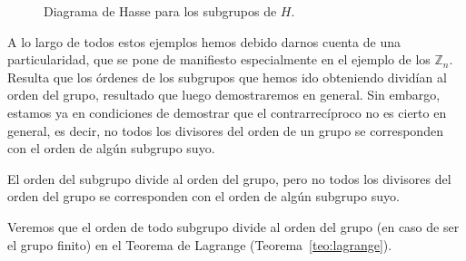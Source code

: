 \begin{ejemplo}
\begin{figure}[H]
    \centering
    \caption{Diagrama de Hasse para los subgrupos de $H$.}
\end{figure}
\end{ejemplo}

A lo largo de todos estos ejemplos hemos debido darnos cuenta de una particularidad, que se pone de manifiesto especialmente en el ejemplo de los $\mathbb{Z}_n$. Resulta que los órdenes de los subgrupos que hemos ido obteniendo dividían al orden del grupo, resultado que luego demostraremos en general. Sin embargo, estamos ya en condiciones de demostrar que el contrarrecíproco no es cierto en general, es decir, no todos los divisores del orden de un grupo se corresponden con el orden de algún subgrupo suyo.

\begin{prop} 
    El orden del subgrupo divide al orden del grupo, pero no todos los divisores del orden del grupo se corresponden con el orden de algún subgrupo suyo.
\end{prop}
Veremos que el orden de todo subgrupo divide al orden del grupo (en caso de ser el grupo finito) en el Teorema de Lagrange (Teorema~\ref{teo:lagrange}).

